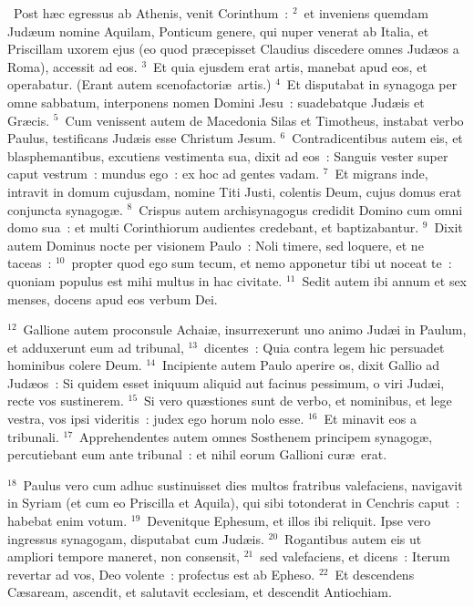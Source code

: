 ~\lettrine[lines=10,image=true,loversize=0.05,lraise=-0.03]{P}{}ost h\ae c egressus ab Athenis, venit Corinthum~:
${}^{2}$~et inveniens quemdam Jud\ae um nomine Aquilam, Ponticum genere, qui nuper venerat ab Italia, et Priscillam uxorem ejus (eo quod pr\ae cepisset Claudius discedere omnes Jud\ae os a Roma), accessit ad eos.
${}^{3}$~Et quia ejusdem erat artis, manebat apud eos, et operabatur. (Erant autem scenofactori\ae\ artis.)
${}^{4}$~Et disputabat in synagoga per omne sabbatum, interponens nomen Domini Jesu~: suadebatque Jud\ae is et Gr\ae cis.
${}^{5}$~Cum venissent autem de Macedonia Silas et Timotheus, instabat verbo Paulus, testificans Jud\ae is esse Christum Jesum.
${}^{6}$~Contradicentibus autem eis, et blasphemantibus, excutiens vestimenta sua, dixit ad eos~: Sanguis vester super caput vestrum~: mundus ego~: ex hoc ad gentes vadam.
${}^{7}$~Et migrans inde, intravit in domum cujusdam, nomine Titi Justi, colentis Deum, cujus domus erat conjuncta synagog\ae .
${}^{8}$~Crispus autem archisynagogus credidit Domino cum omni domo sua~: et multi Corinthiorum audientes credebant, et baptizabantur.
${}^{9}$~Dixit autem Dominus nocte per visionem Paulo~: Noli timere, sed loquere, et ne taceas~:
${}^{10}$~propter quod ego sum tecum, et nemo apponetur tibi ut noceat te~: quoniam populus est mihi multus in hac civitate.
${}^{11}$~Sedit autem ibi annum et sex menses, docens apud eos verbum Dei.


${}^{12}$~Gallione autem proconsule Achai\ae , insurrexerunt uno animo Jud\ae i in Paulum, et adduxerunt eum ad tribunal,
${}^{13}$~dicentes~: Quia contra legem hic persuadet hominibus colere Deum.
${}^{14}$~Incipiente autem Paulo aperire os, dixit Gallio ad Jud\ae os~: Si quidem esset iniquum aliquid aut facinus pessimum, o viri Jud\ae i, recte vos sustinerem.
${}^{15}$~Si vero qu\ae stiones sunt de verbo, et nominibus, et lege vestra, vos ipsi videritis~: judex ego horum nolo esse.
${}^{16}$~Et minavit eos a tribunali.
${}^{17}$~Apprehendentes autem omnes Sosthenem principem synagog\ae , percutiebant eum ante tribunal~: et nihil eorum Gallioni cur\ae\ erat.


${}^{18}$~Paulus vero cum adhuc sustinuisset dies multos fratribus valefaciens, navigavit in Syriam (et cum eo Priscilla et Aquila), qui sibi totonderat in Cenchris caput~: habebat enim votum.
${}^{19}$~Devenitque Ephesum, et illos ibi reliquit. Ipse vero ingressus synagogam, disputabat cum Jud\ae is.
${}^{20}$~Rogantibus autem eis ut ampliori tempore maneret, non consensit,
${}^{21}$~sed valefaciens, et dicens~: Iterum revertar ad vos, Deo volente~: profectus est ab Epheso.
${}^{22}$~Et descendens C\ae saream, ascendit, et salutavit ecclesiam, et descendit Antiochiam.



